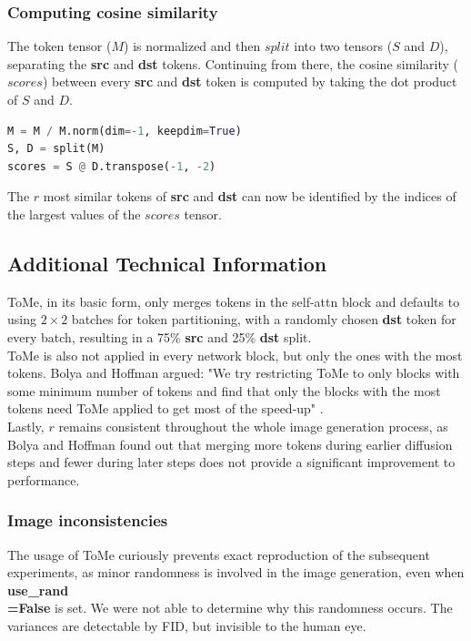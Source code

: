\subsubsection*{Computing cosine similarity}
The token tensor (\(M\)) is normalized and then \(split\) into two tensors (\(S\) and \(D\)), separating the \textbf{src} and \textbf{dst} tokens.
Continuing from there, the cosine similarity (\(scores\)) between every \textbf{src} and \textbf{dst} token is computed by taking the dot product of \(S\) and \(D\).
\begin{lstlisting}[language=Python]
M = M / M.norm(dim=-1, keepdim=True)
S, D = split(M)
scores = S @ D.transpose(-1, -2)
\end{lstlisting}
The \(r\) most similar tokens of \textbf{src} and \textbf{dst} can now be identified by the indices of the largest values of the \(scores\) tensor.



\subsection{Additional Technical Information}
ToMe, in its basic form, only merges tokens in the self-attn block and defaults to using \(2 \times 2\) batches for token partitioning, with a randomly chosen \textbf{dst} token for every batch, resulting in a 75\% \textbf{src} and 25\% \textbf{dst} split. \\
ToMe is also not applied in every network block, but only the ones with the most tokens. Bolya and Hoffman argued:
"We try restricting ToMe to only blocks with some minimum number of tokens and find that only the blocks with the most tokens need ToMe applied to get most of the speed-up" \cite{bolya2023tomesd}.\\
Lastly, \(r\) remains consistent throughout the whole image generation process, as Bolya and Hoffman found out that merging more tokens during earlier diffusion steps and fewer during later steps does not provide a significant improvement to performance.



\subsubsection*{Image inconsistencies}
The usage of ToMe curiously prevents exact reproduction of the subsequent experiments, as minor randomness is involved in the image generation, even when \textbf{use\_rand\\=False} is set. We were not able to determine why this randomness occurs. The
variances are detectable by FID, but invisible to the human eye.

